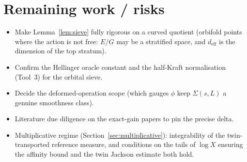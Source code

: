 \documentclass[11pt]{article}
\theoremstyle{plain}
\theoremstyle{definition}
\theoremstyle{remark}
\begin{document}
\section*{Remaining work / risks}
\begin{itemize}[leftmargin=1.4em]
\item Make Lemma~\ref{lem:sieve} fully rigorous on a curved quotient (orbifold
points where the action is not free: $E/G$ may be a stratified space, and
$d_{\mathrm{eff}}$ is the dimension of the top stratum).
\item Confirm the Hellinger oracle constant and the half-Kraft normalisation
(Tool~3) for the orbital sieve.
\item Decide the deformed-operation scope (which gauges $\phi$ keep
$\Sigma(s,L)$ a genuine smoothness class).
\item Literature due diligence on the exact-gain papers to pin the precise delta.
\item Multiplicative regime (Section~\ref{sec:multiplicative}): integrability of
the twin-transported reference measure, and conditions on the tails of $\log X$
ensuring the affinity bound and the twin Jackson estimate both hold.
\end{itemize}
\end{document}
